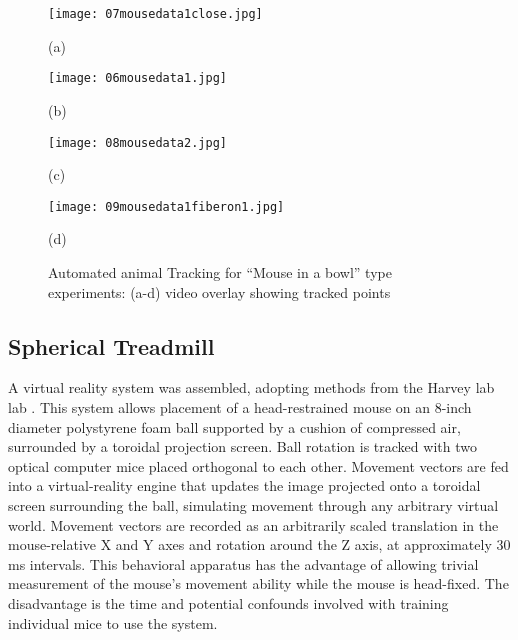 \documentclass[../main.tex]{subfiles}
\begin{document}
\begin{figure}[htb]
	\begin{minipage}[t]{0.24\linewidth}\centering
		\texttt{[image: 07mousedata1close.jpg]}
		\centerline{(a)}
	\end{minipage}
	\hfill
	\begin{minipage}[t]{0.24\linewidth}\centering
		\texttt{[image: 06mousedata1.jpg]}
		\centerline{(b)}
	\end{minipage}
	\begin{minipage}[t]{0.24\linewidth}\centering
		\texttt{[image: 08mousedata2.jpg]}
		\centerline{(c)}
	\end{minipage}
	\begin{minipage}[t]{0.24\linewidth}\centering
		\texttt{[image: 09mousedata1fiberon1.jpg]}
		\centerline{(d)}
	\end{minipage}
	\caption{
		Automated animal Tracking for ``Mouse in a bowl'' type experiments: (a-d) video overlay showing tracked points} \label{fig:Sampling}
\end{figure}

\subsection{Spherical Treadmill}\label{sec:spherical-treadmill}

A virtual reality system was assembled, adopting methods from the Harvey lab lab \cite{harvey_intracellular_2009}.
This system allows placement of a head-restrained mouse on an 8-inch diameter polystyrene foam ball supported by a cushion of compressed air, surrounded by a toroidal projection screen.
Ball rotation is tracked with two optical computer mice placed orthogonal to each other.
Movement vectors are fed into a virtual-reality engine that updates the image projected onto a toroidal screen surrounding the ball, simulating movement through any arbitrary virtual world.
Movement vectors are recorded as an arbitrarily scaled translation in the mouse-relative X and Y axes and rotation around the Z axis, at approximately 30 ms intervals.
This behavioral apparatus has the advantage of allowing trivial measurement of the mouse's movement ability while the mouse is head-fixed.
The disadvantage is the time and potential confounds involved with training individual mice to use the system.
\end{document}
